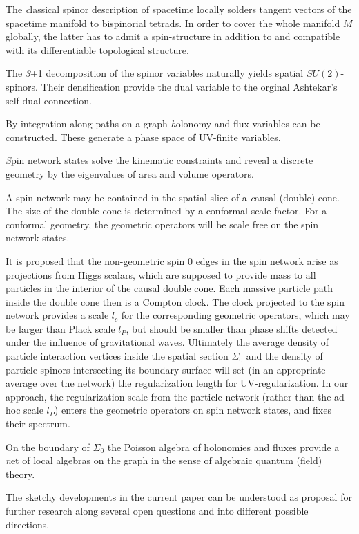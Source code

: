 \documentclass[11pt,a4paper]{article}
\theoremstyle{definition}
\begin{document}
	The {\emph classical} spinor description of spacetime locally solders tangent vectors of the spacetime manifold to bispinorial tetrads. In order to cover the whole manifold $M$ globally,
	the latter has to admit a spin-structure in addition to and compatible with its differentiable topological structure.
	
	The {\emph 3+1 decomposition} of the spinor variables naturally yields spatial $SU(2)$-spinors.
	Their densification provide the dual variable to the orginal Ashtekar's self-dual connection.
	
	By integration along paths on a graph {\emph holonomy and flux variables} can be constructed. These generate a phase space of  UV-finite variables.
	
	{\emph Spin network states} solve the kinematic constraints and reveal a discrete geometry by the  eigenvalues of area and volume operators.
	
	A spin network may be contained in the spatial slice of a {\emph causal (double) cone}.  The size of the double cone is determined by a conformal scale factor. 
	For a conformal geometry, the geometric operators will be scale free on the spin network states.
	
	It is proposed that the non-geometric spin $0$ edges in the spin network arise as projections from Higgs scalars, which are supposed to provide mass to all particles in the interior of the causal double cone. Each massive particle path inside the double cone then is a Compton clock.
	The clock projected to the spin network provides a scale $l_c$ for the corresponding geometric operators, which may be larger than Plack scale $l_P$, but should be smaller than phase shifts detected under the influence of gravitational waves. Ultimately the average density of particle interaction vertices inside the spatial section $\Sigma_0$ and the density of particle spinors intersecting its boundary surface will set (in an appropriate average over the network) the regularization length for UV-regularization. In our approach, the regularization scale from the particle network (rather than the ad hoc scale $l_P$) enters the geometric operators on spin network states, and fixes their spectrum.  
	
	On the boundary of $\Sigma_0$ the Poisson algebra of holonomies and fluxes provide a {\emph net of local algebras on the graph} in the sense of algebraic quantum (field) theory.
	
	The sketchy developments in the current paper can be understood as proposal for further research along several open questions and into different possible directions.
	
\end{document}
